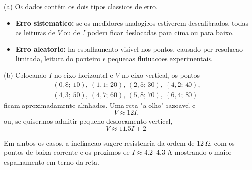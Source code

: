 (a) Os dados contêm os dois tipos classicos de erro.

\begin{itemize}
\item \textbf{Erro sistematico:} se os medidores analogicos estiverem descalibrados, todas as leituras de $V$ ou de $I$ podem ficar deslocadas para cima ou para baixo.
\item \textbf{Erro aleatorio:} ha espalhamento visivel nos pontos, causado por resolucao limitada, leitura do ponteiro e pequenas flutuacoes experimentais.
\end{itemize}

(b) Colocando $I$ no eixo horizontal e $V$ no eixo vertical, os pontos
\begin{gather*}
(0{,}8;\,10),\ (1{,}1;\,20),\ (2{,}5;\,30),\ (4{,}2;\,40),\\
(4{,}3;\,50),\ (4{,}7;\,60),\ (5{,}8;\,70),\ (6{,}4;\,80)
\end{gather*}
ficam aproximadamente alinhados. Uma reta "a olho" razoavel e
\[
V\approx 12I,
\]
ou, se quisermos admitir pequeno deslocamento vertical,
\[
V\approx 11.5I+2.
\]

Em ambos os casos, a inclinacao sugere resistencia da ordem de $12\,\Omega$, com os pontos de baixa corrente e os proximos de $I\approx4.2$--$4.3$ A mostrando o maior espalhamento em torno da reta.